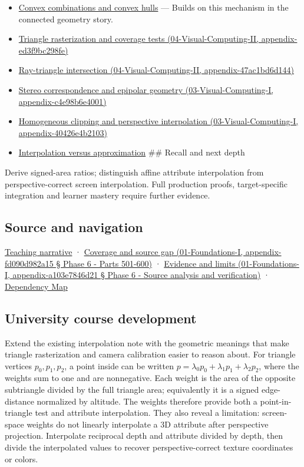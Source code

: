 \begin{itemize}
\item
  \hyperref[appendix-0026ec42c9d5]{Convex combinations and convex hulls} --- Builds on this mechanism in the connected geometry story.
\item
  \href{}{Triangle rasterization and coverage tests (04-Visual-Computing-II, appendix-ed3f9bc298fe)}
\item
  \href{}{Ray-triangle intersection (04-Visual-Computing-II, appendix-47ac1bd6d144)}
\item
  \href{}{Stereo correspondence and epipolar geometry (03-Visual-Computing-I, appendix-c4e98b6e4001)}
\item
  \href{}{Homogeneous clipping and perspective interpolation (03-Visual-Computing-I, appendix-40426e4b2103)}
\item
  \hyperref[appendix-0c2a5f69851e]{Interpolation versus approximation} \#\# Recall and next depth
\end{itemize}

Derive signed-area ratios; distinguish affine attribute interpolation from perspective-correct screen interpolation. Full production proofs, target-specific integration and learner mastery require further evidence.

\subsection{Source and navigation}\label{source-and-navigation}

\href{Continuous\%20Notes/Computing\%20Foundations\%20-\%20From\%20Bits\%20to\%20C++\%20and\%20Systems\%20APIs\#The\%20sensor\%20needs\%20coordinates\%20inside\%20the\%20triangle}{Teaching narrative} · \href{}{Coverage and source gap (01-Foundations-I, appendix-fd090d982a15 § Phase 6 - Parts 501-600)} · \href{}{Evidence and limits (01-Foundations-I, appendix-a103e7846d21 § Phase 6 - Source analysis and verification)} · \hyperref[appendix-4ad47bdd269a]{Dependency Map}

\subsection{University course development}\label{university-course-development}

Extend the existing interpolation note with the geometric meanings that make triangle rasterization and camera calibration easier to reason about. For triangle vertices \(p_0,p_1,p_2\), a point inside can be written \(p=\lambda_0p_0+\lambda_1p_1+\lambda_2p_2\), where the weights sum to one and are nonnegative. Each weight is the area of the opposite subtriangle divided by the full triangle area; equivalently it is a signed edge-distance normalized by altitude. The weights therefore provide both a point-in-triangle test and attribute interpolation. They also reveal a limitation: screen-space weights do not linearly interpolate a 3D attribute after perspective projection. Interpolate reciprocal depth and attribute divided by depth, then divide the interpolated values to recover perspective-correct texture coordinates or colors.

